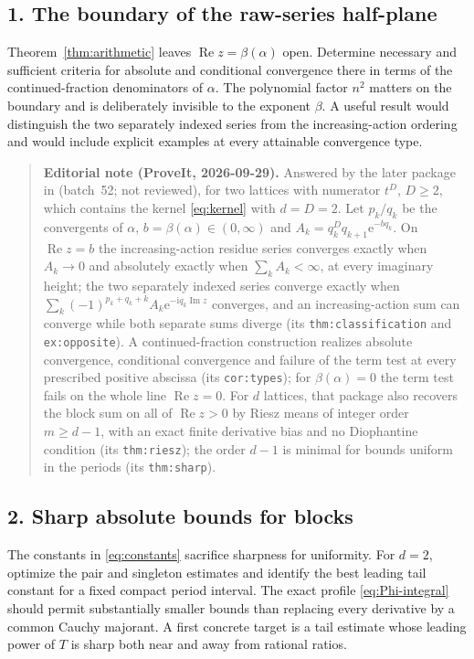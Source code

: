 \documentclass[11pt,a4paper]{article}
\numberwithin{equation}{section}
\theoremstyle{definition}
\theoremstyle{remark}
\newcommand{\ii}{\mathrm i}
\newcommand{\e}{\mathrm e}
\newcommand{\re}{\operatorname{Re}}
\newcommand{\im}{\operatorname{Im}}
\begin{document}
\subsection*{1. The boundary of the raw-series half-plane}
Theorem~\ref{thm:arithmetic} leaves $\re z=\beta(\alpha)$ open. Determine
necessary and sufficient criteria for absolute and conditional convergence
there in terms of the continued-fraction denominators of $\alpha$.
The polynomial factor $n^2$ matters on the boundary and is deliberately
invisible to the exponent $\beta$. A useful result would distinguish the
two separately indexed series from the increasing-action ordering and
would include explicit examples at every attainable convergence type.
\begin{quote}\small\textbf{Editorial note (ProveIt, 2026-09-29).} Answered by the later package  in  (batch~52; not reviewed), for two lattices with numerator $t^D$, $D\ge2$, which contains the kernel \eqref{eq:kernel} with $d=D=2$. Let $p_k/q_k$ be the convergents of $\alpha$, $b=\beta(\alpha)\in(0,\infty)$ and $A_k=q_k^Dq_{k+1}\e^{-bq_k}$. On $\re z=b$ the increasing-action residue series converges exactly when $A_k\to0$ and absolutely exactly when $\sum_kA_k<\infty$, at every imaginary height; the two separately indexed series converge exactly when $\sum_k(-1)^{p_k+q_k+k}A_k\e^{-\ii q_k\im z}$ converges, and an increasing-action sum can converge while both separate sums diverge (its \texttt{thm:classification} and \texttt{ex:opposite}). A continued-fraction construction realizes absolute convergence, conditional convergence and failure of the term test at every prescribed positive abscissa (its \texttt{cor:types}); for $\beta(\alpha)=0$ the term test fails on the whole line $\re z=0$. For $d$ lattices, that package also recovers the block sum on all of $\re z>0$ by Riesz means of integer order $m\ge d-1$, with an exact finite derivative bias and no Diophantine condition (its \texttt{thm:riesz}); the order $d-1$ is minimal for bounds uniform in the periods (its \texttt{thm:sharp}).\end{quote}

\subsection*{2. Sharp absolute bounds for blocks}
The constants in \eqref{eq:constants} sacrifice sharpness for uniformity.
For $d=2$, optimize the pair and singleton estimates and identify the best
leading tail constant for a fixed compact period interval. The exact
profile \eqref{eq:Phi-integral} should permit substantially smaller bounds
than replacing every derivative by a common Cauchy majorant. A first
concrete target is a tail estimate whose leading power of $T$ is sharp
both near and away from rational ratios.
\end{document}

